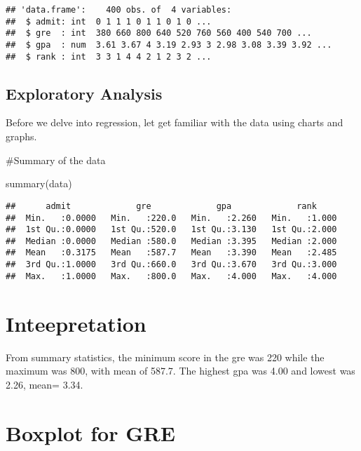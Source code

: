 \documentclass[
]{article}
\newenvironment{Shaded}{\begin{snugshade}}{\end{snugshade}}
\newcommand{\FunctionTok}[1]{\textcolor[rgb]{0.00,0.00,0.00}{#1}}
\newcommand{\NormalTok}[1]{#1}
\begin{document}
\begin{verbatim}
## 'data.frame':    400 obs. of  4 variables:
##  $ admit: int  0 1 1 1 0 1 1 0 1 0 ...
##  $ gre  : int  380 660 800 640 520 760 560 400 540 700 ...
##  $ gpa  : num  3.61 3.67 4 3.19 2.93 3 2.98 3.08 3.39 3.92 ...
##  $ rank : int  3 3 1 4 4 2 1 2 3 2 ...
\end{verbatim}

\hypertarget{exploratory-analysis}{%
\subsection{Exploratory Analysis}\label{exploratory-analysis}}

Before we delve into regression, let get familiar with the data using
charts and graphs.

\#Summary of the data

\begin{Shaded}
\begin{Highlighting}[]
\FunctionTok{summary}\NormalTok{(data)}
\end{Highlighting}
\end{Shaded}

\begin{verbatim}
##      admit             gre             gpa             rank      
##  Min.   :0.0000   Min.   :220.0   Min.   :2.260   Min.   :1.000  
##  1st Qu.:0.0000   1st Qu.:520.0   1st Qu.:3.130   1st Qu.:2.000  
##  Median :0.0000   Median :580.0   Median :3.395   Median :2.000  
##  Mean   :0.3175   Mean   :587.7   Mean   :3.390   Mean   :2.485  
##  3rd Qu.:1.0000   3rd Qu.:660.0   3rd Qu.:3.670   3rd Qu.:3.000  
##  Max.   :1.0000   Max.   :800.0   Max.   :4.000   Max.   :4.000
\end{verbatim}

\hypertarget{inteepretation}{%
\section{Inteepretation}\label{inteepretation}}

From summary statistics, the minimum score in the gre was 220 while the
maximum was 800, with mean of 587.7. The highest gpa was 4.00 and lowest
was 2.26, mean= 3.34.

\hypertarget{boxplot-for-gre}{%
\section{Boxplot for GRE}\label{boxplot-for-gre}}
\end{document}
